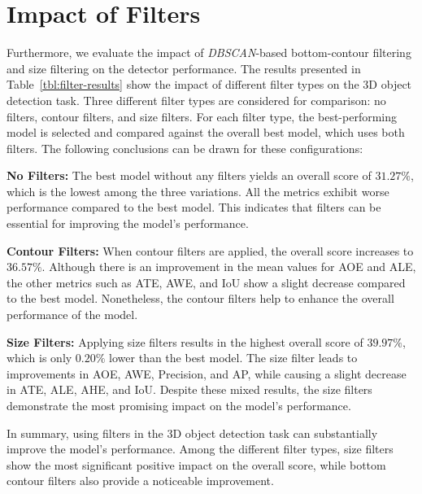 
\newpage

\section{Impact of Filters}
\label{sec:impactcontourfiltering}

Furthermore, we evaluate the impact of \textit{DBSCAN}-based bottom-contour filtering and size filtering on the detector performance.
The results presented in Table~\ref{tbl:filter-results} show the impact of different filter types on the 3D object detection task.
Three different filter types are considered for comparison: no filters, contour filters, and size filters.
For each filter type, the best-performing model is selected and compared against the overall best model, which uses both filters.
The following conclusions can be drawn for these configurations:

\textbf{No Filters:} The best model without any filters yields an overall score of $31.27\%$, which is the lowest among the three variations.
All the metrics exhibit worse performance compared to the best model.
This indicates that filters can be essential for improving the model's performance.

\textbf{Contour Filters:} When contour filters are applied, the overall score increases to $36.57\%$.
Although there is an improvement in the mean values for AOE and ALE, the other metrics such as ATE, AWE, and IoU show a slight decrease compared to the best model.
Nonetheless, the contour filters help to enhance the overall performance of the model.

\textbf{Size Filters:} Applying size filters results in the highest overall score of $39.97\%$, which is only $0.20\%$ lower than the best model.
The size filter leads to improvements in AOE, AWE, Precision, and AP, while causing a slight decrease in ATE, ALE, AHE, and IoU.
Despite these mixed results, the size filters demonstrate the most promising impact on the model's performance.

In summary, using filters in the 3D object detection task can substantially improve the model's performance.
Among the different filter types, size filters show the most significant positive impact on the overall score, while bottom contour filters also provide a noticeable improvement.

